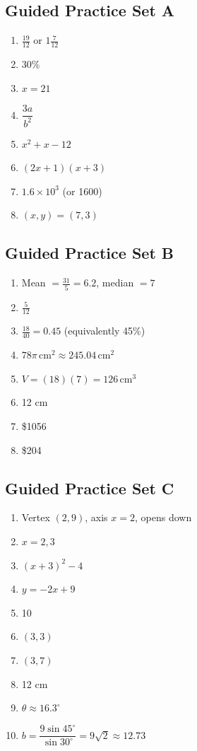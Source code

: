 \documentclass[12pt,oneside]{article}
\begin{document}
\subsection*{Guided Practice Set A}
\begin{enumerate}
  \item $\frac{19}{12}$ or $1\frac{7}{12}$
  \item $30\%$
  \item $x=21$
  \item $\dfrac{3a}{b^2}$
  \item $x^2+x-12$
  \item $(2x+1)(x+3)$
  \item $1.6\times10^3$ (or 1600)
  \item $(x,y)=(7,3)$
\end{enumerate}

\subsection*{Guided Practice Set B}
\begin{enumerate}
  \item Mean $=\frac{31}{5}=6.2$, median $=7$
  \item $\frac{5}{12}$
  \item $\frac{18}{40}=0.45$ (equivalently 45\%)
  \item $78\pi\,\text{cm}^2 \approx 245.04\,\text{cm}^2$
  \item $V=(18)(7)=126\,\text{cm}^3$
  \item 12 cm
  \item \$1056
  \item \$204
\end{enumerate}

\subsection*{Guided Practice Set C}
\begin{enumerate}
  \item Vertex $(2,9)$, axis $x=2$, opens down
  \item $x=2,3$
  \item $(x+3)^2-4$
  \item $y=-2x+9$
  \item 10
  \item $(3,3)$
  \item $(3,7)$
  \item 12 cm
  \item $\theta\approx16.3^\circ$
  \item $b=\dfrac{9\sin45^\circ}{\sin30^\circ}=9\sqrt2\approx12.73$
\end{enumerate}
\end{document}
